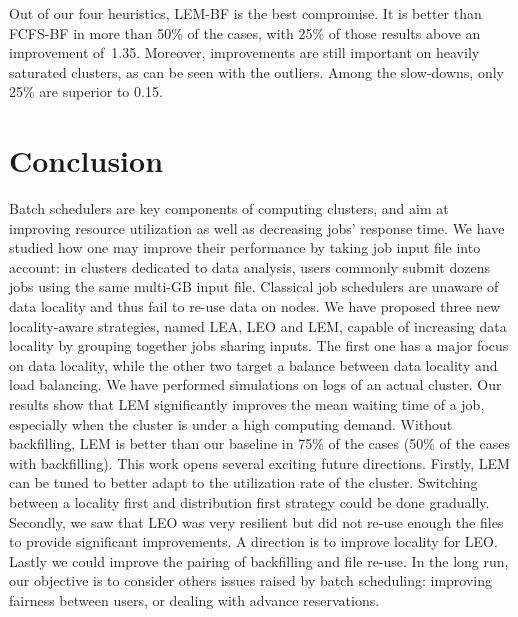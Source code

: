 \documentclass[sigconf,review,anonymous]{acmart}
\begin{document}
Out of our four heuristics, LEM-BF is the best compromise.
It is better than FCFS-BF in more than 50\% of the cases, 
with 25\% of those results above an improvement of~1.35.
Moreover, improvements are still important on heavily saturated clusters, as can be seen with the outliers.
Among the slow-downs, only 25\% are superior to 0.15.


\section{Conclusion}\label{sec.conclusion}


Batch schedulers are key components of computing clusters, and aim at
improving resource utilization as well as decreasing jobs' response
time. We have studied how one may improve their performance by taking
job input file into account: in clusters dedicated to data analysis,
users commonly submit dozens jobs using the same multi-GB input
file. Classical job schedulers are unaware of data locality and thus
fail to re-use data on nodes. We have proposed three new locality-aware
strategies, named LEA, LEO and LEM,
capable of increasing data locality by grouping together 
jobs sharing inputs. The first one has a major focus on data locality,
while the other two target a balance between data locality and load
balancing. We have performed simulations on logs of an actual
cluster. Our results show that LEM significantly improves the mean
waiting time of a job, especially  
when the cluster is under a high computing demand.
Without backfilling, LEM is better than our baseline in 75\% of the
cases (50\% of the cases with backfilling).
This work opens several exciting future directions.
Firstly, LEM can be tuned to better adapt to the utilization rate of the cluster.
Switching between a locality first and distribution first strategy could be done 
gradually.
Secondly, we saw that LEO was very resilient but did not re-use enough the files to
provide significant improvements. A direction is to 
improve locality for LEO.
Lastly we could improve the pairing of backfilling and file re-use.
In the long run, our objective is to consider others issues raised by batch scheduling:
improving fairness between users, or dealing with advance reservations.
 



\end{document}
